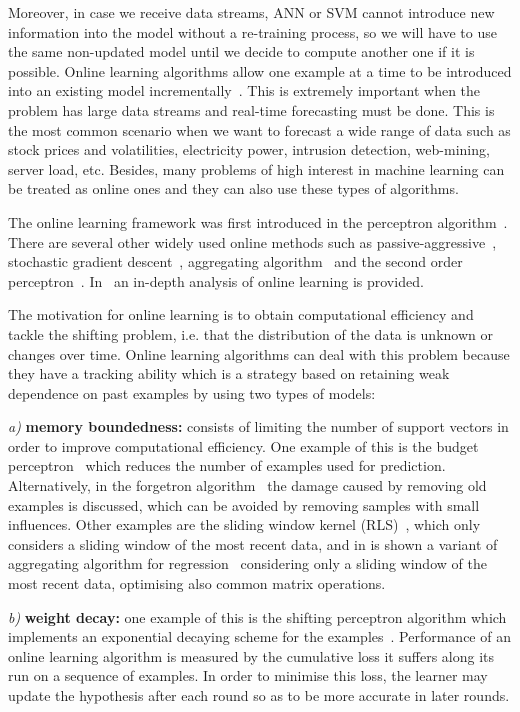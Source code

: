 Moreover, in case we receive data streams, ANN or SVM cannot introduce new information into the model without a re-training process, so we will have to use the same non-updated model until we decide to compute another one if it is possible.  Online learning algorithms allow one example at a time to be introduced into an existing model incrementally~\cite{vovk2005}. This is extremely important when the problem has large data streams and real-time forecasting must be done.  This is the most common scenario when we want to forecast a wide range of data such as stock prices and volatilities, electricity power, intrusion detection, web-mining, server load, etc.  Besides, many problems of high interest in machine learning can be treated as online ones and they can also use these types of algorithms.

The online learning framework was first introduced in the perceptron algorithm~\cite{rosenblatt58}. There are several other widely used online methods such as passive-aggressive~\cite{crammerETall2006}, stochastic gradient descent~\cite{zhang2004}, aggregating algorithm~\cite{vovk2001} and the second order perceptron~\cite{cesa-bianchi2005}.  In~\cite{cesa-bianchi2006} an in-depth analysis of online learning is provided.

The motivation for online learning is to obtain computational efficiency and tackle the shifting problem, i.e. that the distribution of the data is unknown or changes over time. Online learning algorithms can deal with this problem because they have a tracking ability which is a strategy based on retaining weak dependence on past examples by using two types of models: 

\textit{a)} \textbf{memory boundedness:} consists of limiting the number of support vectors in order to improve computational efficiency. One example of this is the budget perceptron~\cite{crammeretal2004} which reduces the number of examples used for prediction. Alternatively, in the forgetron algorithm~\cite{dekeletal2008} the damage caused by removing old examples is discussed, which can be avoided by removing samples with small influences. Other examples are the sliding window kernel (RLS)~\cite{vanvaerenberghetal2006}, which only considers a sliding window of the most recent data, and in \cite{arce+salinas2012} is shown a variant of aggregating algorithm for regression~\cite{vovk2001} considering only a sliding window of the most recent data, optimising also common matrix operations.

\textit{b)} \textbf{weight decay:} one example of this is the shifting perceptron algorithm which implements an exponential decaying scheme for the examples~\cite{cavallantietal2007}.
Performance of an online learning algorithm is measured by the cumulative loss it suffers along its run on a sequence of examples. In order to minimise this loss, the learner may update the hypothesis after each round so as to be more accurate in later rounds.


